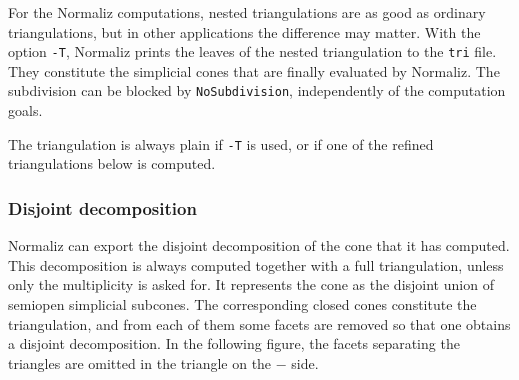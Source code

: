 \documentclass[12pt,a4paper]{scrartcl}
\theoremstyle{definition}
\begin{document}
For the Normaliz computations, nested triangulations are as good as ordinary triangulations, but in other applications the difference may matter. With the option \verb|-T|, Normaliz prints the leaves of the nested triangulation to the \verb|tri| file. They constitute the simplicial cones that are finally evaluated by Normaliz. The subdivision can be blocked by \verb|NoSubdivision|, independently of the computation goals.

The triangulation is always plain if \verb|-T| is used, or if one of the refined triangulations below is computed.

\subsubsection{Disjoint decomposition}\label{Disjoint}

Normaliz can export the disjoint decomposition of the cone that it has computed. This decomposition is always computed together with a full triangulation, unless only the multiplicity is asked for. It represents the cone as the disjoint union of semiopen simplicial subcones. The corresponding closed cones constitute the triangulation, and from each of them some facets are removed so that one obtains a disjoint decomposition. In the following figure, the facets separating the triangles are omitted in the triangle on the $-$ side.
\end{document}
